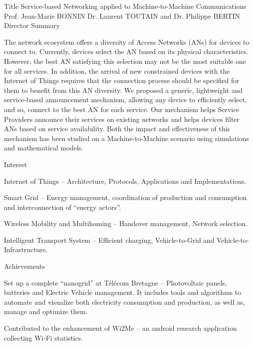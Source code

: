 \begin{cvhonors}
  \cvhonortwo
    {Title}
    {Service-based Networking applied to Machine-to-Machine Communications}
  \cvhonor
    {Prof. Jean-Marie BONNIN}
    {Dr. Laurent TOUTAIN and Dr. Philippe BERTIN}
    {}
    {Director}
  \cventryshort
    {Summary}
    {\begin{justify}
    \quad The network ecosystem offers a diversity of Access Networks (ANs) for devices to connect to. Currently, devices select the AN based on its physical characteristics. However, the best AN satisfying this selection may not be the most suitable one for all services. In addition, the arrival of new constrained devices with the Internet of Things requires that the connection process should be specified for them to benefit from this AN diversity. We proposed a generic, lightweight and service-based announcement mechanism, allowing any device to efficiently select, and so, connect to the best AN for each service. Our mechanism helps Service Providers announce their services on existing networks and helps devices filter ANs based on service availability. Both the impact and effectiveness of this mechanism has been studied on a Machine-to-Machine scenario using simulations and mathematical models.
    \end{justify}}


  \cventryshort   
    {Interest}
    {\begin{cvitems}
        \item {Internet of Things -- Architecture, Protocols, Applications and Implementations.}
        \item {Smart Grid -- Energy management, coordination of production and consumption and interconnection of ``energy actors''.}
        \item {Wireless Mobility and Multihoming -- Handover management, Network selection.}
        \item {Intelligent Transport System -- Efficient charging, Vehicle-to-Grid and Vehicle-to-Infrastructure.}
      \end{cvitems}
      }
  \cventryshort
    {Achievements}
    {\begin{cvitems}
        \item {Set up a complete ``nanogrid'' at T\'{e}l\'{e}com Bretagne -- Photovoltaic panels, batteries and Electric Vehicle management. It includes tools and algorithms to automate and visualize both electricity consumption and production, as well as, manage and optimize them.}
        \item {Contributed to the enhancement of Wi2Me – an android research application collecting Wi-Fi statistics.}
      \end{cvitems}
      }


\end{cvhonors}
